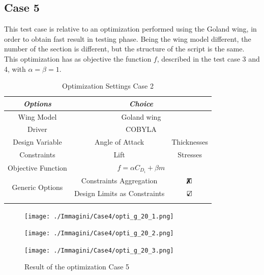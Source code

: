 \subsection{Case 5}
This test case is relative to an optimization performed using the Goland wing, in order to obtain fast result in testing phase. Being the wing model different, the number of the section is different, but the structure of the script is the same. This optimization has as objective the function $f$, described in the test case 3 and 4, with $\alpha = \beta=1$.
\begin{table}[H]
	\centering
	\begin{tabular}{ccc}
		\hline
		\multicolumn{1}{|c|}{\textit{Options}}                          & \multicolumn{2}{c|}{\textit{Choice}}                                               \\ \hline
		\multicolumn{1}{|c|}{Wing Model}                       & \multicolumn{2}{c|}{Goland wing}                                                     \\ \hline
		\multicolumn{1}{|c|}{Driver}                           & \multicolumn{2}{c|}{COBYLA}                                                     \\ \hline
		\multicolumn{1}{|c|}{Design Variable}                  & \multicolumn{1}{c|}{Angle of Attack}&\multicolumn{1}{c|}{Thicknesses}                                                     \\ \hline
		\multicolumn{1}{|c|}{Constraints}                  & \multicolumn{1}{c|}{Lift }&\multicolumn{1}{c|}{Stresses}                                                     \\ \hline
		\multicolumn{1}{|c|}{Objective Function}               & \multicolumn{2}{c|}{$f= \alpha C_{D_i}+\beta m$}                                                     \\ \hline
		\multicolumn{1}{|c|}{\multirow{2}{*}{Generic Options}} & \multicolumn{1}{c|}{Constraints Aggregation}      & \multicolumn{1}{c|}{$\text{\rlap{$\xmark$}}\square$} \\ \cline{2-3} 
		\multicolumn{1}{|c|}{}                                 & \multicolumn{1}{c|}{Design Limits as Constraints} & \multicolumn{1}{c|}{$\text{\rlap{$\checkmark$}}\square$} \\ \hline
		&                                                   &                      
	\end{tabular}
	\caption{Optimization Settings Case 2}
	\label{tab:6_4}
\end{table}
\begin{figure}[H]
	\centering
	\texttt{[image: ./Immagini/Case4/opti\_g\_20\_1.png]}
\end{figure}
\begin{figure}[H]
	\centering
	\texttt{[image: ./Immagini/Case4/opti\_g\_20\_2.png]}
\end{figure}
\begin{figure}[H]
	\centering
	\texttt{[image: ./Immagini/Case4/opti\_g\_20\_3.png]}
	\caption{Result of the optimization Case 5}
	\label{fig:6_6}
\end{figure}

